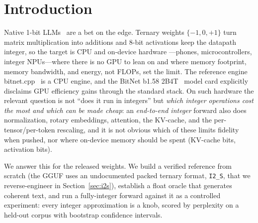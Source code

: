 \documentclass[11pt]{article}
\begin{document}
\begin{abstract}
behind it: rotation \emph{preserves} the load-bearing outlier information (an
invertible basis change) whereas robust scaling \emph{destroys} it---and because
2-bit, like the KV cache, needs an asymmetric (zero-point) code, not a symmetric one. Every
finding replicates on a second, architecturally distinct 1-bit model
(Falcon3-1B-1.58, SwiGLU with an untied head, vs.\ BitNet's squared-ReLU with
subln): same KV-granularity ordering, same per-channel-asymmetric 2-bit rescue,
same activation-scale collapse, and the same measured Key per-channel bias
($0.79\sigma$ in both). We also document the undocumented \texttt{I2\_S}
packed-ternary format, reverse-engineered to make the study possible. Code, a verified reference and Rust port, and a one-command
harness to extend to full corpora and other model sizes are released.
\end{abstract}

\section{Introduction}
Native 1-bit LLMs~\cite{wang2023bitnet,ma2024era} are a bet on the edge. Ternary
weights $\{-1,0,+1\}$ turn matrix multiplication into additions and 8-bit
activations keep the datapath integer, so the target is CPU and on-device hardware
---phones, microcontrollers, integer NPUs---where there is no GPU to lean on and
where memory footprint, memory bandwidth, and energy, not FLOPs, set the limit. The
reference engine bitnet.cpp~\cite{wang2025bitnetcpp} is a CPU engine, and the BitNet
b1.58 2B4T~\cite{ma2024bitnet2b4t} model card explicitly disclaims GPU efficiency
gains through the standard stack. On such hardware the relevant question is not
``does it run in integers'' but \emph{which integer operations cost the most and
which can be made cheap}: an \emph{end-to-end integer} forward also does
normalization, rotary embeddings, attention, the KV-cache, and the
per-tensor/per-token rescaling, and it is not obvious which of these limits fidelity
when pushed, nor where on-device memory should be spent (KV-cache bits, activation
bits).

We answer this for the released weights. We build a verified reference from scratch
(the GGUF uses an undocumented packed ternary format, \texttt{I2\_S}, that we
reverse-engineer in Section~\ref{sec:i2s}), establish a float oracle that generates
coherent text, and run a fully-integer forward against it as a controlled
experiment: every integer approximation is a knob, scored by perplexity on a
held-out corpus with bootstrap confidence intervals.
\end{document}
